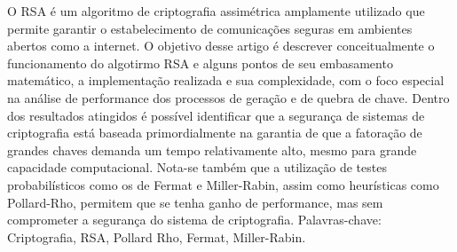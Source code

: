 \begin{resumo} 

O RSA é um algoritmo de criptografia assimétrica amplamente utilizado que permite garantir o estabelecimento de comunicações seguras em ambientes abertos como a internet. O objetivo desse artigo é descrever conceitualmente o funcionamento do algotirmo RSA e alguns pontos de seu embasamento matemático, a implementação realizada e sua complexidade, com o foco especial na análise de performance dos processos de geração e de quebra de chave. Dentro dos resultados atingidos é possível identificar que a segurança de sistemas de criptografia está baseada primordialmente na garantia de que a fatoração de grandes chaves demanda um tempo relativamente alto, mesmo para grande capacidade computacional. Nota-se também que a utilização de testes probabilísticos como os de Fermat e Miller-Rabin, assim como heurísticas como Pollard-Rho, permitem que se tenha ganho de performance, mas sem comprometer a segurança do sistema de criptografia.
\newline
\newline
Palavras-chave: Criptografia, RSA, Pollard Rho, Fermat, Miller-Rabin.

\end{resumo}
